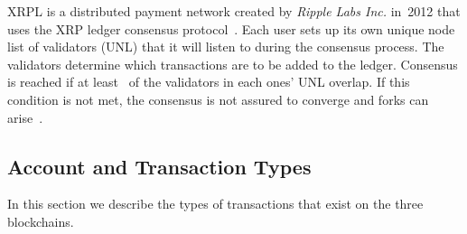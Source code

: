 XRPL is a distributed payment network created by \textit{Ripple Labs Inc.} in~2012 that uses the XRP ledger consensus protocol~\cite{Chase2018}.
Each user sets up its own unique node list of validators (UNL) that it will listen to during the consensus process. 
The validators determine which transactions are to be added to the ledger. 
Consensus is reached if at least~ of the validators in each ones' UNL overlap. If this condition is not met, the consensus is not assured to converge and forks can arise~\cite{Chase2018}.
















\subsection{Account and Transaction Types}
In this section we describe the types of transactions that exist on the three blockchains.

